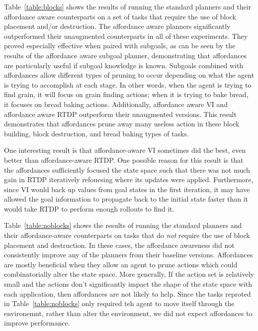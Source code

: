 \documentclass[]{article}
\begin{document}
Table~\ref{table:blocks} shows the results of running the standard
planners and their affordance aware counterparts on a set of tasks
that require the use of block placement and/or destruction.  The
affordance aware planners significantly outperformed their unaugmented
counterparts in all of these experiments. They proved
especially effective when paired with subgoals, as can be seen by the
results of the affordance aware subgoal planner, demonstrating that
affordances are particularly useful if subgoal knowledge is known.
Subgoals combined with affordances allow different types of pruning to
occur depending on what the agent is trying to accomplish at each
stage. In other words, when the agent is trying to find grain, it will
focus on grain finding actions; when it is trying to bake bread, it
focuses on bread baking actions.  Additionally, affordance aware VI
and affordance aware RTDP outperform their unaugmented versions.  This
result demonstrates that affordances prune away many useless action in
these block building, block destruction, and bread baking types of
tasks. 

One interesting result is that affordance-aware VI sometimes
did the best, even better than affordance-aware RTDP. One possible reason for this result is that the
affordances sufficiently focused the state space such that there was
not much gain in RTDP iteratively refoucsing where its updates were applied.
Furthermore, since VI would back up values from goal states in the first iteration,
it may have allowed the goal information to propagate back to the initial
state faster than it would take RTDP to perform enough rollouts to find it.

Table~\ref{table:noblocks} shows the results of running the standard
planners and their affordance-aware counterparts on tasks that do {\it
  not} require the use of block placement and destruction.  In these
cases, the affordance awareness did not consistently improve any of the planners
from their baseline versions. Affordances are mostly beneficial when
they allow an agent to prune actions which could combinatorially alter
the state space. More generally, If the action set is relatively small 
and the actions don't significantly impact the shape of the state space 
with each application, then affordances are not likely to help. Since
the tasks reproted in Table~\ref{table:noblocks} only required
teh agent to move itself through the environemnt, rather than alter the
environment, we did not expect affordances to improve performance.  
\end{document}
